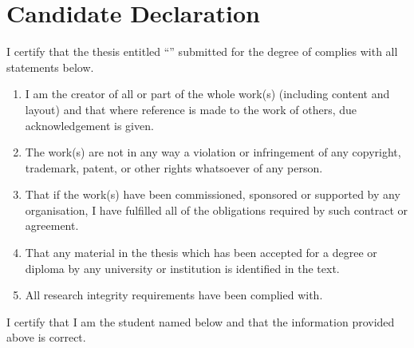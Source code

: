 \cleardoublepage
{}
{}
\chapter*{Candidate Declaration}
I certify that the thesis entitled ``\textit{\thetitle{}}'' submitted for the degree of \thedegree{} complies with all statements below.\bigskip
\begin{enumerate}[label=(\roman*)]
  \item I am the creator of all or part of the whole work(s) (including content and layout) and that where reference is made to the work of others, due acknowledgement is given.    
  \item The work(s) are not in any way a violation or infringement of any copyright, trademark, patent, or other rights whatsoever of any person.
  \item That if the work(s) have been commissioned, sponsored or supported by any organisation, I have fulfilled all of the obligations required by such contract or agreement.
  \item That any material in the thesis which has been accepted for a degree or diploma by any university or institution is identified in the text.
  \item All research integrity requirements have been complied with.
\end{enumerate}\bigskip
I certify that I am the student named below and that the information provided above is correct.

\vspace{2cm}
\noindent
\hspace{\fill}
\parbox[b]{0.4\linewidth}{
  \hrulefill\\
  \raggedleft
  \theauthor{}\\
  \footnotesize
  \thedate{}
}

